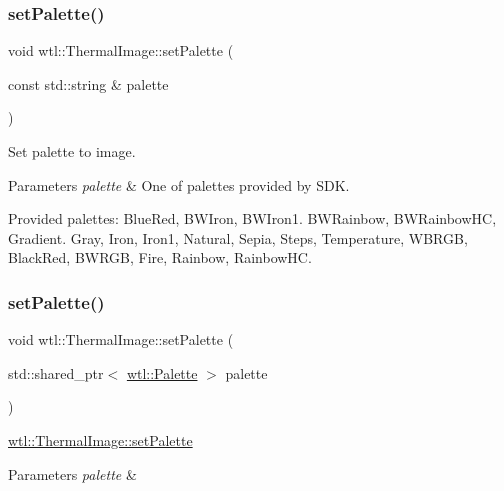 \subsubsection{\texorpdfstring{set\+Palette()}{setPalette()}\hspace{0.1cm}{\footnotesize\ttfamily [1/2]}}
{\footnotesize\ttfamily void wtl\+::\+Thermal\+Image\+::set\+Palette (\begin{DoxyParamCaption}\item[{const std\+::string \&}]{palette }\end{DoxyParamCaption})}



Set palette to image. 


\begin{DoxyParams}{Parameters}
{\em palette} & One of palettes provided by S\+DK.\\
\hline
\end{DoxyParams}
Provided palettes\+: Blue\+Red, B\+W\+Iron, B\+W\+Iron1. B\+W\+Rainbow, B\+W\+Rainbow\+HC, Gradient. Gray, Iron, Iron1, Natural, Sepia, Steps, Temperature, W\+B\+R\+GB, Black\+Red, B\+W\+R\+GB, Fire, Rainbow, Rainbow\+HC. \mbox{\label{classwtl_1_1_thermal_image_ac72bcde5f4b324f8a0a37322ac419c82}} 
\subsubsection{\texorpdfstring{set\+Palette()}{setPalette()}\hspace{0.1cm}{\footnotesize\ttfamily [2/2]}}
{\footnotesize\ttfamily void wtl\+::\+Thermal\+Image\+::set\+Palette (\begin{DoxyParamCaption}\item[{std\+::shared\+\_\+ptr$<$ \hyperlink{classwtl_1_1_palette}{wtl\+::\+Palette} $>$}]{palette }\end{DoxyParamCaption})}



\hyperlink{classwtl_1_1_thermal_image_a3c53fac4f759dfdbe3f73863449326b9}{wtl\+::\+Thermal\+Image\+::set\+Palette} 


\begin{DoxyParams}{Parameters}
{\em palette} & \\
\hline
\end{DoxyParams}


